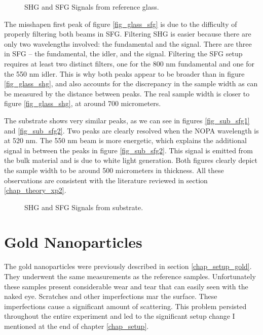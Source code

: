 \begin{figure}[h]
\centering
{}
\caption{SHG and SFG Signals from reference glass.}
\end{figure}

The misshapen first peak of figure \ref{fig_glass_sfg} is due to the difficulty of properly filtering both beams in SFG. Filtering SHG is easier because there are only two wavelengths involved: the fundamental and the signal. There are three in SFG -- the fundamental, the idler, and the signal. Filtering the SFG setup requires at least two distinct filters, one for the 800 nm fundamental and one for the 550 nm idler. This is why both peaks appear to be broader than in figure \ref{fig_glass_shg}, and also accounts for the discrepancy in the sample width as can be measured by the distance between peaks. The real sample width is closer to figure \ref{fig_glass_shg}, at around 700 micrometers.

The substrate shows very similar peaks, as we can see in figures \ref{fig_sub_sfg1} and \ref{fig_sub_sfg2}. Two peaks are clearly resolved when the NOPA wavelength is at 520 nm. The 550 nm beam is more energetic, which explains the additional signal in between the peaks in figure \ref{fig_sub_sfg2}. This signal is emitted from the bulk material and is due to white light generation. Both figures clearly depict the sample width to be around 500 micrometers in thickness. All these observations are consistent with the literature reviewed in section \ref{chap_theory_xp2}.

\begin{figure}[h]
\centering
{}
\caption{SHG and SFG Signals from substrate.}
\end{figure}


\section{Gold Nanoparticles}
The gold nanoparticles were previously described in section \ref{chap_setup_gold}. They underwent the same measurements as the reference samples. Unfortunately these samples present considerable wear and tear that can easily seen with the naked eye. Scratches and other imperfections mar the surface. These imperfections cause a significant amount of scattering. This problem persisted throughout the entire experiment and led to the significant setup change I mentioned at the end of chapter \ref{chap_setup}.

